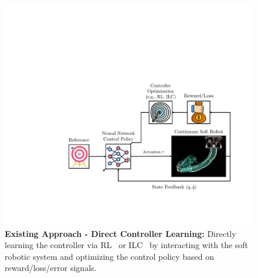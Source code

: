 \begin{figure}[ht]
    \centering
    \includegraphics[width=0.75\linewidth]{introduction/figures/controller_learning_v1_cropped.pdf}
    \caption{\textbf{Existing Approach - Direct Controller Learning:} 
    Directly learning the controller via \gls{RL}~\citep{morimoto2021model, jitosho2023reinforcement, alessi2024pushing} or \gls{ILC}~\citep{hofer2019iterative, pierallini2023provably} by interacting with the soft robotic system and optimizing the control policy based on reward/loss/error signals.
    }
    \label{fig:introduction:controller_learning}
\end{figure}

